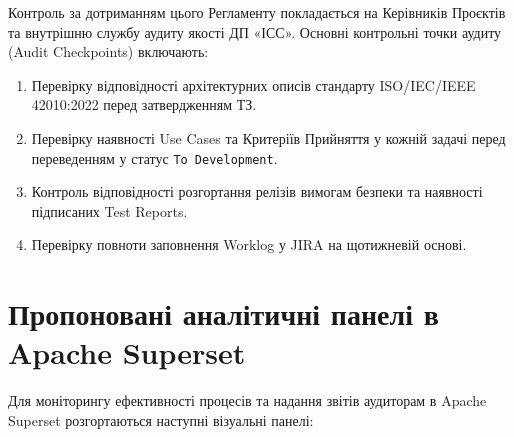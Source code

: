 \documentclass{article}
\begin{document}
Контроль за дотриманням цього Регламенту покладається на Керівників Проєктів та внутрішню службу аудиту якості ДП «ІСС». Основні контрольні точки аудиту (Audit Checkpoints) включають:
\begin{enumerate}
    \item Перевірку відповідності архітектурних описів стандарту ISO/IEC/IEEE 42010:2022 перед затвердженням ТЗ.
    \item Перевірку наявності Use Cases та Критеріїв Прийняття у кожній задачі перед переведенням у статус \texttt{To Development}.
    \item Контроль відповідності розгортання релізів вимогам безпеки та наявності підписаних Test Reports.
    \item Перевірку повноти заповнення Worklog у JIRA на щотижневій основі.
\end{enumerate}

\section{Пропоновані аналітичні панелі в Apache Superset}

Для моніторингу ефективності процесів та надання звітів аудиторам в Apache Superset розгортаються наступні візуальні панелі:
\end{document}
